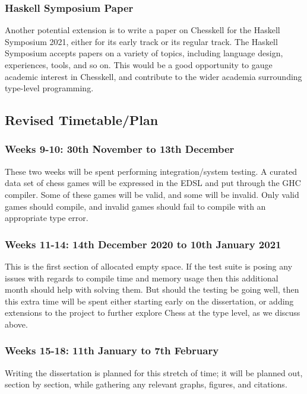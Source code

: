 \documentclass[12pt, a4paper, bibliography=totocnumbered]{scrartcl}
\begin{document}
\subsubsection{Haskell Symposium Paper}

Another potential extension is to write a paper on Chesskell for the Haskell Symposium 2021, either for its early track or its regular track. The Haskell Symposium accepts papers on a variety of topics, including language design, experiences, tools, and so on. This would be a good opportunity to gauge academic interest in Chesskell, and contribute to the wider academia surrounding type-level programming.

\subsection{Revised Timetable/Plan}

\subsubsection{Weeks 9-10: 30th November to 13th December}

These two weeks will be spent performing integration/system testing. A curated data set of chess games will be expressed in the EDSL and put through the GHC compiler. Some of these games will be valid, and some will be invalid. Only valid games should compile, and invalid games should fail to compile with an appropriate type error.

\subsubsection{Weeks 11-14: 14th December 2020 to 10th January 2021}

This is the first section of allocated empty space. If the test suite is posing any issues with regards to compile time and memory usage then this additional month should help with solving them. But should the testing be going well, then this extra time will be spent either starting early on the dissertation, or adding extensions to the project to further explore Chess at the type level, as we discuss above.

\subsubsection{Weeks 15-18: 11th January to 7th February}

Writing the dissertation is planned for this stretch of time; it will be planned out, section by section, while gathering any relevant graphs, figures, and citations.
\end{document}
